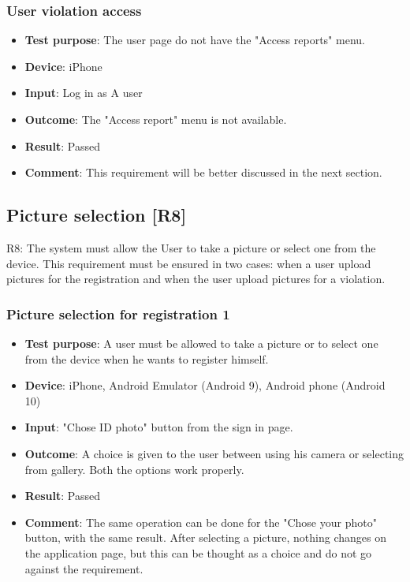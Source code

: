 \documentclass[../ATD.tex]{subfiles}
\begin{document}
    \subsubsection{User violation access}\label{subsubsec:user-violation-access}
    \begin{itemize}
        \item \textbf{Test purpose}: The user page do not have the "Access reports" menu.
        \item \textbf{Device}: iPhone
        \item \textbf{Input}: Log in as A user
        \item \textbf{Outcome}: The "Access report" menu is not available.
        \item \textbf{Result}: Passed
        \item \textbf{Comment}: This requirement will be better discussed in the next section.
    \end{itemize}

    \subsection{Picture selection [R8]}\label{subsec:picture-selection}
    R8: The system must allow the User to take a picture or select one from the device.
    This requirement must be ensured in two cases: when a user upload pictures for the registration and when the user upload pictures for a violation.

    \subsubsection{Picture selection for registration 1}\label{subsubsec:picture-selection-for-registration-1}
    \begin{itemize}
        \item \textbf{Test purpose}: A user must be allowed to take a picture or to select one from the device when he wants to register himself.
        \item \textbf{Device}: iPhone, Android Emulator (Android 9), Android phone (Android 10)
        \item \textbf{Input}: "Chose ID photo" button from the sign in page.
        \item \textbf{Outcome}: A choice is given to the user between using his camera or selecting from gallery.
        Both the options work properly.
        \item \textbf{Result}: Passed
        \item \textbf{Comment}: The same operation can be done for the "Chose your photo" button, with the same result.
        After selecting a picture, nothing changes on the application page, but this can be thought as a choice and do not go against the requirement.
    \end{itemize}
\end{document}
